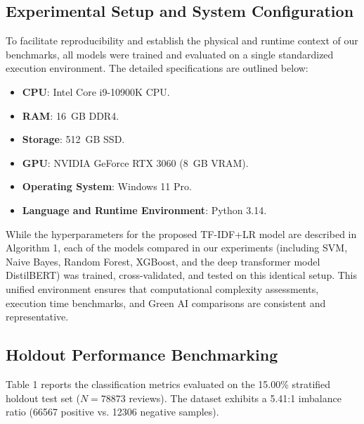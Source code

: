 \documentclass[11pt]{article}
\begin{document}
\subsection{Experimental Setup and System Configuration}
To facilitate reproducibility and establish the physical and runtime context of our benchmarks, all models were trained and evaluated on a single standardized execution environment. The detailed specifications are outlined below:
\begin{itemize}
    \item \textbf{CPU}: Intel Core i9-10900K CPU.
    \item \textbf{RAM}: 16~GB DDR4.
    \item \textbf{Storage}: 512~GB SSD.
    \item \textbf{GPU}: NVIDIA GeForce RTX 3060 (8~GB VRAM).
    \item \textbf{Operating System}: Windows 11 Pro.
    \item \textbf{Language and Runtime Environment}: Python 3.14.
\end{itemize}
While the hyperparameters for the proposed TF-IDF+LR model are described in Algorithm 1, each of the models compared in our experiments (including SVM, Naive Bayes, Random Forest, XGBoost, and the deep transformer model DistilBERT) was trained, cross-validated, and tested on this identical setup. This unified environment ensures that computational complexity assessments, execution time benchmarks, and Green AI comparisons are consistent and representative.

\subsection{Holdout Performance Benchmarking}
Table 1 reports the classification metrics evaluated on the 15.00\% stratified holdout test set ($N = 78873$ reviews). The dataset exhibits a 5.41:1 imbalance ratio (66567 positive vs. 12306 negative samples).
\end{document}
